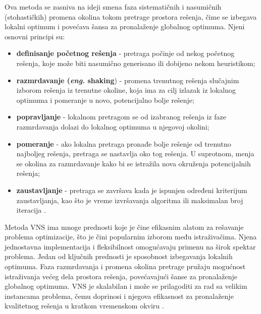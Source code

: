 \documentclass[12pt,oneside]{memoir}
\begin{document}
Ova metoda se zasniva na ideji smena faza sistematičnih i nasumičnih (stohastičkih) promena okolina tokom pretrage prostora rešenja, čime se izbegava lokalni optimum i povećava šansa za pronalaženje globalnog optimuma. Njeni osnovni principi su:
\begin{itemize}
    \item \textbf{definisanje početnog rešenja} - pretraga počinje od nekog početnog rešenja, koje može biti nasumično generisano ili dobijeno nekom heuristikom;
    \item \textbf{razmrdavanje (\textit{eng.} shaking}) - promena trenutnog rešenja slučajnim izborom rešenja iz trenutne okoline, koja ima za cilj izlazak iz lokalnog optimuma i pomeranje u novo, potencijalno bolje rešenje;
    \item \textbf{popravljanje} - lokalnom pretragom se od izabranog rešenja iz faze razmrdavanja dolazi do lokalnog optimuma u njegovoj okolini;
    \item \textbf{pomeranje} - ako lokalna pretraga pronađe bolje rešenje od trenutno najboljeg rešenja, pretraga se nastavlja oko tog rešenja. U suprotnom, menja se okolina za razmrdavanje kako bi se istražila nova okruženja potencijalnih rešenja;
    \item \textbf{zaustavljanje} - pretraga se završava kada je ispunjen određeni kriterijum zaustavljanja, kao što je vreme izvršavanja algoritma ili maksimalan broj iteracija \cite{mladenovic2009}.
\end{itemize}

Metoda VNS ima mnoge prednosti koje je čine efikasnim alatom za rešavanje problema optimizacije, što je čini popularnim izborom među istraživačima. Njena jednostavna implementacija i fleksibilnost omogućavaju primenu na širok spektar problema. Jedan od ključnih prednosti je sposobnost izbegavanja lokalnih optimuma. Faza razmrdavanja i promena okolina pretrage pružaju mogućnost istraživanja većeg dela prostora rešenja, povećavajući šanse za pronalaženje globalnog optimuma. VNS je skalabilan i može se prilagoditi za rad sa velikim instancama problema, čemu doprinosi i njegova efikasnost za pronalaženje kvalitetnog rešenja u kratkom vremenskom okviru \cite{mladenovic2010}.\\
\end{document}
